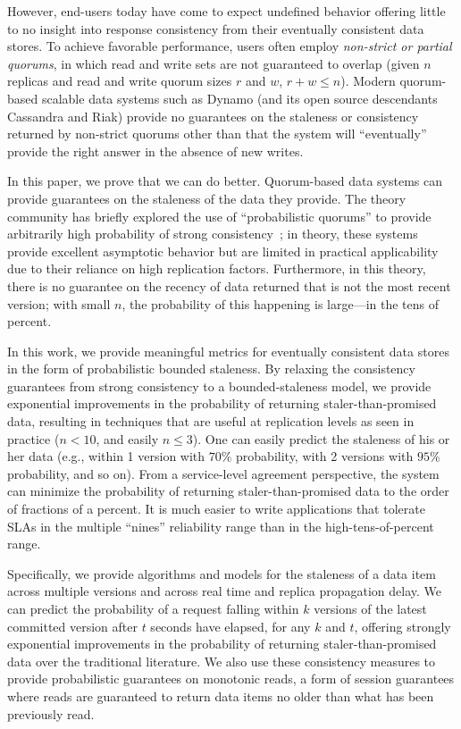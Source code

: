 \documentclass{vldb}
\begin{document}
However, end-users today have come to expect undefined behavior
offering little to no insight into response consistency from their
eventually consistent data stores.  To achieve favorable performance,
users often employ \textit{non-strict or partial quorums}, in which
read and write sets are not guaranteed to overlap (given $n$ replicas
and read and write quorum sizes $r$ and $w$, $r+w \leq n$).  Modern
quorum-based scalable data systems such as Dynamo (and its open source
descendants Cassandra and Riak) provide no guarantees on the staleness
or consistency returned by non-strict quorums other than that the
system will ``eventually'' provide the right answer in the absence of
new writes.

In this paper, we prove that we can do better. Quorum-based data systems
can provide guarantees on the staleness of the data they provide. The
theory community has briefly explored the use of ``probabilistic
quorums'' to provide arbitrarily high probability of strong
consistency~\cite{prob-quorum}; in theory, these systems provide
excellent asymptotic behavior but are limited in practical
applicability due to their reliance on high replication factors.
Furthermore, in this theory, there is no guarantee on the recency of
data returned that is not the most recent version; with small $n$,
the probability of this happening is large---in the tens of percent.

In this work, we provide meaningful metrics for eventually consistent
data stores in the form of probabilistic bounded staleness.  By
relaxing the consistency guarantees from strong consistency to a
bounded-staleness model, we provide exponential improvements in the
probability of returning staler-than-promised data, resulting in
techniques that are useful at replication levels as seen in practice
($n<10$, and easily $n\leq3$).  One can easily predict the staleness
of his or her data (e.g., within 1 version with $70\%$ probability,
with 2 versions with $95\%$ probability, and so on).  From a
service-level agreement perspective, the system can minimize the
probability of returning staler-than-promised data to the order of
fractions of a percent.  It is much easier to write applications that
tolerate SLAs in the multiple ``nines'' reliability range than in the
high-tens-of-percent range.

Specifically, we provide algorithms and models for the staleness of a
data item across multiple versions and across real time and replica
propagation delay.  We can predict the probability of a request
falling within $k$ versions of the latest committed version after $t$
seconds have elapsed, for any $k$ and $t$, offering strongly
exponential improvements in the probability of returning
staler-than-promised data over the traditional literature.  We also
use these consistency measures to provide probabilistic guarantees on
monotonic reads, a form of session guarantees where reads are
guaranteed to return data items no older than what has been previously
read.
\end{document}

